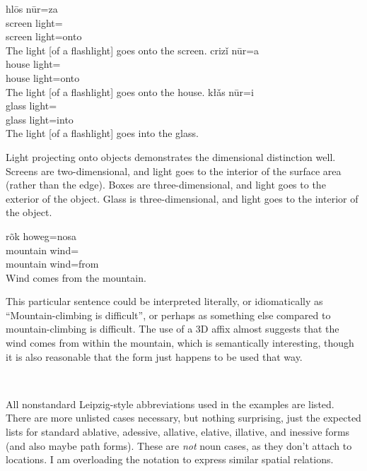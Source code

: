 \documentclass[12pt]{article}
\begin{document}
    \begin{exe}
        \ex
        \glll
        hlōs nūr=za \\
        screen light=\AllTwo{} \\
        screen light=onto \\
        \glt
        The light [of a flashlight] goes onto the screen.
        \ex
        \glll
        crizǐ nūr=a \\
        house light=\AllThree{} \\
        house light=onto \\
        \glt
        The light [of a flashlight] goes onto the house.
        \ex
        \glll
        kłǎs nūr=i \\
        glass light=\IllThree{} \\
        glass light=into \\
        \glt
        The light [of a flashlight] goes into the glass.
    \end{exe}

    Light projecting onto objects demonstrates the dimensional distinction well.
    Screens are two-dimensional, and light goes to the interior of the surface area (rather than the edge).
    Boxes are three-dimensional, and light goes to the exterior of the object.
    Glass is three-dimensional, and light goes to the interior of the object.

    \begin{exe}
        \ex
        \glll
        rõk howeg=nosa \\
        mountain wind=\AblThree \\
        mountain wind=from \\
        \glt
        Wind comes from the mountain.
    \end{exe}

    This particular sentence could be interpreted literally,
    or idiomatically as ``Mountain-climbing is difficult'',
    or perhaps as something else compared to mountain-climbing is difficult.
    The use of a 3D affix almost suggests that the wind comes from within the mountain,
    which is semantically interesting,
    though it is also reasonable that the form just happens to be used that way.

    ~

    All nonstandard Leipzig-style abbreviations used in the examples are listed.
    There are more unlisted cases necessary, but nothing surprising,
    just the expected lists for standard ablative, adessive, allative, elative, illative, and inessive forms
    (and also maybe path forms).
    These are \textit{not} noun cases, as they don't attach to locations.
    I am overloading the notation to express similar spatial relations.

    \printglossaries
\end{document}
